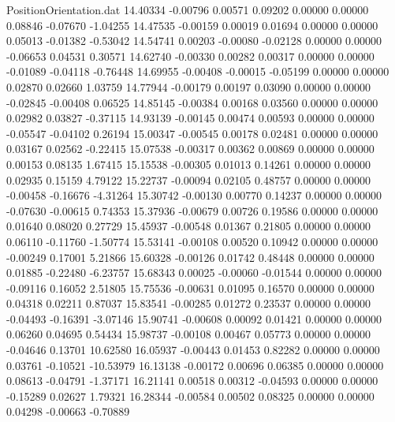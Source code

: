 \begin{filecontents}{PositionOrientation.dat}
  14.40334   -0.00796    0.00571     0.09202    0.00000    0.00000    0.08846   -0.07670   -1.04255
  14.47535   -0.00159    0.00019     0.01694    0.00000    0.00000    0.05013   -0.01382   -0.53042
  14.54741    0.00203   -0.00080    -0.02128    0.00000    0.00000   -0.06653    0.04531    0.30571
  14.62740   -0.00330    0.00282     0.00317    0.00000    0.00000   -0.01089   -0.04118   -0.76448
  14.69955   -0.00408   -0.00015    -0.05199    0.00000    0.00000    0.02870    0.02660    1.03759
  14.77944   -0.00179    0.00197     0.03090    0.00000    0.00000   -0.02845   -0.00408    0.06525
  14.85145   -0.00384    0.00168     0.03560    0.00000    0.00000    0.02982    0.03827   -0.37115
  14.93139   -0.00145    0.00474     0.00593    0.00000    0.00000   -0.05547   -0.04102    0.26194
  15.00347   -0.00545    0.00178     0.02481    0.00000    0.00000    0.03167    0.02562   -0.22415
  15.07538   -0.00317    0.00362     0.00869    0.00000    0.00000    0.00153    0.08135    1.67415
  15.15538   -0.00305    0.01013     0.14261    0.00000    0.00000    0.02935    0.15159    4.79122
  15.22737   -0.00094    0.02105     0.48757    0.00000    0.00000   -0.00458   -0.16676   -4.31264
  15.30742   -0.00130    0.00770     0.14237    0.00000    0.00000   -0.07630   -0.00615    0.74353
  15.37936   -0.00679    0.00726     0.19586    0.00000    0.00000    0.01640    0.08020    0.27729
  15.45937   -0.00548    0.01367     0.21805    0.00000    0.00000    0.06110   -0.11760   -1.50774
  15.53141   -0.00108    0.00520     0.10942    0.00000    0.00000   -0.00249    0.17001    5.21866
  15.60328   -0.00126    0.01742     0.48448    0.00000    0.00000    0.01885   -0.22480   -6.23757
  15.68343    0.00025   -0.00060    -0.01544    0.00000    0.00000   -0.09116    0.16052    2.51805
  15.75536   -0.00631    0.01095     0.16570    0.00000    0.00000    0.04318    0.02211    0.87037
  15.83541   -0.00285    0.01272     0.23537    0.00000    0.00000   -0.04493   -0.16391   -3.07146
  15.90741   -0.00608    0.00092     0.01421    0.00000    0.00000    0.06260    0.04695    0.54434
  15.98737   -0.00108    0.00467     0.05773    0.00000    0.00000   -0.04646    0.13701   10.62580
  16.05937   -0.00443    0.01453     0.82282    0.00000    0.00000    0.03761   -0.10521  -10.53979
  16.13138   -0.00172    0.00696     0.06385    0.00000    0.00000    0.08613   -0.04791   -1.37171
  16.21141    0.00518    0.00312    -0.04593    0.00000    0.00000   -0.15289    0.02627    1.79321
  16.28344   -0.00584    0.00502     0.08325    0.00000    0.00000    0.04298   -0.00663   -0.70889

\end{filecontents}
